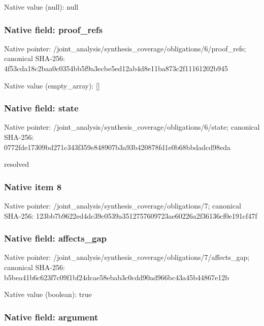 \documentclass[10pt,a4paper]{article}
\begin{document}
Native value (null): null



\subsubsection{Native field: proof\_refs}


Native pointer: /joint\_analysis/synthesi\allowbreak{}s\_coverage/obligations/6\allowbreak{}/proof\_refs; canonical SHA-256: 4f53cda18c2baa0c0354bb5f\allowbreak{}9a3ecbe5ed12ab4d8e11ba87\allowbreak{}3c2f11161202b945



Native value (empty\_array): []



\subsubsection{Native field: state}


Native pointer: /joint\_analysis/synthesi\allowbreak{}s\_coverage/obligations/6\allowbreak{}/state; canonical SHA-256: 0772fde17309bd271c343f35\allowbreak{}9e848907b3a93b420878fd1e\allowbreak{}0b68bbdadcd98eda


resolved


\subsubsection{Native item 8}


Native pointer: /joint\_analysis/synthesi\allowbreak{}s\_coverage/obligations/7; canonical SHA-256: 123bb7b9622ed4dc39c0539a\allowbreak{}3512757609723ae60226a2f3\allowbreak{}6136cf0e191cf47f



\subsubsection{Native field: affects\_gap}


Native pointer: /joint\_analysis/synthesi\allowbreak{}s\_coverage/obligations/7\allowbreak{}/affects\_gap; canonical SHA-256: b5bea41b6c623f7c09f1bf24\allowbreak{}dcae58ebab3c0cdd90ad966b\allowbreak{}c43a45b44867e12b



Native value (boolean): true



\subsubsection{Native field: argument}
\end{document}
